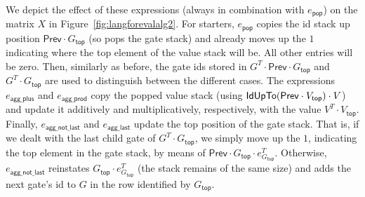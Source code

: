 We depict the effect of these expressions (always in combination with $e_{\mathsf{pop}}$) on the matrix $X$ in Figure~\ref{fig:langforevalalg2}.
For starters, $e_{\mathsf{pop}}$ copies the id stack up position $\mathsf{Prev}\cdot G_{\mathsf{top}}$ (so pops
the gate stack) and already moves up the $1$ indicating where the top element of the value stack will be. All other
entries will be zero. Then, similarly as before, the gate ids stored in $G^T\cdot\mathsf{Prev}\cdot G_{\mathsf{top}}$ and $G^T\cdot G_{\mathsf{top}}$ are used to distinguish between the different cases. The expressions $e_{\mathsf{agg\_plus}}$ and $e_{\mathsf{agg\_prod}}$ copy the popped value stack (using $\mathsf{IdUpTo}(\mathsf{Prev}\cdot V_{\mathsf{top}}) \cdot V$) and
update it additively and multiplicatively, respectively, with the value $V^T \cdot V_{\mathsf{top}}$. Finally, $e_{\mathsf{agg\_not\_last}}$ and $e_{\mathsf{agg\_last}}$ update the top position of the gate stack. That is,
if we dealt with the last child gate of $G^T\cdot G_{\mathsf{top}}$, we simply move up the $1$, indicating the top element in the gate stack, by means of $\mathsf{Prev}\cdot G_{\mathsf{top}} \cdot e_{G_{\mathsf{top}}}^T$. Otherwise, $e_{\mathsf{agg\_not\_last}}$ reinstates $G_{\mathsf{top}}\cdot e_{G_{\mathsf{top}}}^T$ (the stack remains of the same size)
and adds the next gate's id to $G$ in the row identified by $G_{\mathsf{top}}$.
   
